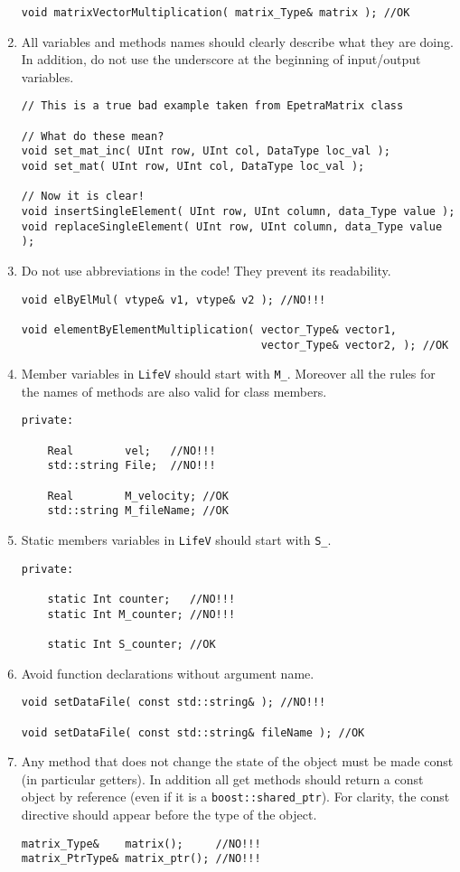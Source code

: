 \documentclass[10p]{article}
\begin{document}
\begin{enumerate}
\begin{lstlisting}
void matrixVectorMultiplication( matrix_Type& matrix ); //OK
\end{lstlisting}
  \item All variables and methods names should clearly describe what they are doing. In addition, do not use the underscore at the beginning of input/output variables.
\begin{lstlisting}
// This is a true bad example taken from EpetraMatrix class

// What do these mean?
void set_mat_inc( UInt row, UInt col, DataType loc_val );
void set_mat( UInt row, UInt col, DataType loc_val );

// Now it is clear!
void insertSingleElement( UInt row, UInt column, data_Type value );
void replaceSingleElement( UInt row, UInt column, data_Type value );

  \end{lstlisting}
  \item Do not use abbreviations in the code! They prevent its readability.
\begin{lstlisting}
void elByElMul( vtype& v1, vtype& v2 ); //NO!!!

void elementByElementMultiplication( vector_Type& vector1,
                                     vector_Type& vector2, ); //OK
\end{lstlisting}
  \item Member variables in \texttt{LifeV} should start with \texttt{M\_}. Moreover all the rules for the names of methods are also valid for class members.
\begin{lstlisting}
private:

    Real        vel;   //NO!!!
    std::string File;  //NO!!!

    Real        M_velocity; //OK
    std::string M_fileName; //OK
\end{lstlisting}
  \item Static members variables in \texttt{LifeV} should start with \texttt{S\_}.
\begin{lstlisting}
private:

    static Int counter;   //NO!!!
    static Int M_counter; //NO!!!

    static Int S_counter; //OK
\end{lstlisting}
  \item Avoid function declarations without argument name.
\begin{lstlisting}
void setDataFile( const std::string& ); //NO!!!

void setDataFile( const std::string& fileName ); //OK
\end{lstlisting}
  \item Any method that does not change the state of the object must be made const (in particular getters). In addition all get methods should return a const object by reference (even if it is a \texttt{boost::shared\_ptr}). For clarity, the const directive should appear before the type of the object. 
\begin{lstlisting}
matrix_Type&    matrix();     //NO!!!
matrix_PtrType& matrix_ptr(); //NO!!!


\end{lstlisting}
\end{enumerate}
\end{document}
